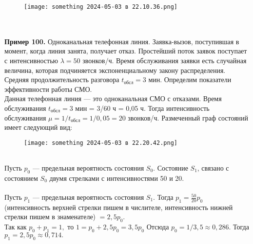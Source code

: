 \documentclass{article}
\begin{document}
\begin{figure}[h] 
\centering
\texttt{[image: something 2024-05-03 в 22.10.36.png]}
\label{fig:my_label}
\end{figure} \\ \\

\indent \; \; \; \textbf{Пример  100.} Одноканальная телефонная линия. Заявка-вызов, поступившая в момент, когда линия занята, получает отказ. Простей­ший  поток  заявок  поступает  с  интенсивностью $\lambda = 50 $ звонков/ч. Время обслуживания заявки есть случайная величина,  которая подчиняется  экспоненциальному закону распределения.  Средняя  продолжительность разговора $t_{\text{обсл}} = 3$  мин.  Определим  показатели  эффективности работы СМО. \\ \indent Данная телефонная линия — это одноканальная СМО с отказами. Время обслуживания $t_{\text{обсл}} = 3$ мин = 3/60 ч = 0,05 ч. Тогда интенсивность обслуживания $\mu = 1/t_{\text{обсл}} = 1/0,05 = 20$ звонков/ч. Размеченный граф состояний имеет следующий вид:
\begin{figure}[h] 
\centering
\texttt{[image: something 2024-05-03 в 22.20.42.png]}
\label{fig:my_label}
\end{figure} \\ 
\indent Пусть $p_0$  —  предельная  вероятность состояния $S_0$.  Состояние  $S_1$, связано с состоянием $S_0$ двумя стрелками с интенсивностями 50 и 20. \\ \\ \noindent
Пусть $p_1$  —  предельная  вероятность  состояния  $S_1$.  Тогда $p_1 = \frac{50}{20}p_0$ (интенсивность верхней стрелки пишем в числителе, интенсивность нижней стрелки пишем в знаменателе) $= 2,5p_0$. \\ \indent
Так как $p_0 + p_1 = 1,$ то  $1 = p_0 + 2,5p_0 = 3,5p_0$  Отсюда $p_0 = 1/3,5 \approx 0,286.$ Тогда $p_1 = 2,5p_0 \approx 0,714.$ \\ \indent
\end{document}
